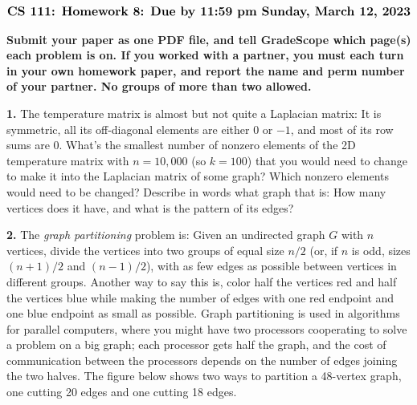\documentclass[11pt]{article}
\begin{document}
$$\mbox{\Large \bf CS 111: Homework 8: Due by 11:59 pm Sunday, March 12, 2023}$$
\par\smallskip\noindent
{\bf Submit your paper as one PDF file,
and tell GradeScope which page(s) each problem is on.
If you worked with a partner, you must each turn in your own 
homework paper, and report the name and perm number of your partner.
No groups of more than two allowed.
}

\par\bigskip
{\bf 1.}
The temperature matrix is almost but not quite a Laplacian matrix:
It is symmetric, all its off-diagonal elements are either $0$ or $-1$,
and most of its row sums are $0$.
What's the smallest number of nonzero elements of the
2D temperature matrix with $n=10,000$ (so $k=100$) that you would need to change to make 
it into the Laplacian matrix of some graph? 
Which nonzero elements would need to be changed?
Describe in words what graph that is:
How many vertices does it have, and what is the pattern of its edges?

\par\bigskip
{\bf 2.}
The {\em graph partitioning} problem is:
Given an undirected graph $G$ with $n$ vertices, 
divide the vertices into two groups of equal size $n/2$ 
(or, if $n$ is odd, sizes $(n+1)/2$ and $(n-1)/2$),
with as few edges as possible between vertices in different groups.
Another way to say this is,
color half the vertices red and half the vertices blue while making
the number of edges with one red endpoint and one blue endpoint as small as possible.
Graph partitioning is used in algorithms for parallel computers, 
where you might have two processors cooperating to solve a problem on a big graph;
each processor gets half the graph, 
and the cost of communication between the processors depends on the number
of edges joining the two halves.
The figure below shows two ways to partition a 48-vertex graph,
one cutting 20 edges and one cutting 18 edges.
\end{document}
